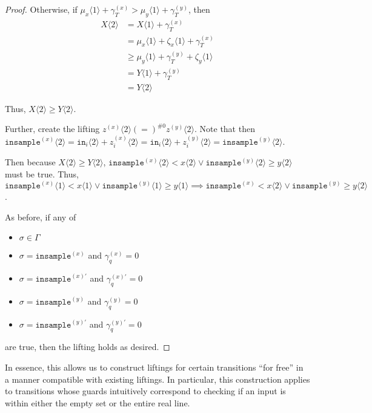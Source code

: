 \documentclass[12pt]{article}
\newcommand{\brangle}[1]{\langle #1 \rangle}
\theoremstyle{definition}
\begin{document}
\begin{proof}
    Otherwise, if $\mu_x\brangle{1}+\gamma_T^{(x)}> \mu_y\brangle{1}+\gamma_T^{(y)}$, then \begin{align*}
        X\brangle{2} &= X\brangle{1} + \gamma_T^{(x)}\\
        &=\mu_x\brangle{1} + \zeta_x\brangle{1} + \gamma_T^{(x)}\\
        &\geq \mu_y\brangle{1} +\gamma_T^{(y)}+\zeta_y\brangle{1}\\
        &=Y\brangle{1} + \gamma_T^{(y)}\\
        &= Y\brangle{2}
    \end{align*}

    Thus, $X\brangle{2}\geq Y\brangle{2}$.

    Further, create the lifting $z^{(x)}\brangle{2}(=)^{\#0}z^{(y)}\brangle{2}$. Note that then $\texttt{insample}^{(x)}\brangle{2}=\texttt{in}_i\brangle{2} + z_i^{(x)}\brangle{2} =\texttt{in}_i\brangle{2} + z_i^{(y)}\brangle{2}=\texttt{insample}^{(y)}\brangle{2}$.

    Then because $X\brangle{2} \geq Y\brangle{2}$, $\texttt{insample}^{(x)}\brangle{2}<x\brangle{2}\lor \texttt{insample}^{(y)}\brangle{2}\geq y\brangle{2}$ must be true. Thus, $\texttt{insample}^{(x)}\brangle{1}<x\brangle{1}\lor\texttt{insample}^{(y)}\brangle{1}\geq y\brangle{1}\implies \texttt{insample}^{(x)}<x\brangle{2}\lor\texttt{insample}^{(y)}\geq y\brangle{2}$.

    As before, if any of \begin{itemize}
        \item $\sigma \in \Gamma$
        \item $\sigma = \texttt{insample}^{(x)}$ and $\gamma_q^{(x)}=0$ 
        \item $\sigma = \texttt{insample}^{(x)\prime}$ and $\gamma_q^{(x)\prime}=0$ 
        \item $\sigma = \texttt{insample}^{(y)}$ and $\gamma_q^{(y)}=0$
        \item $\sigma = \texttt{insample}^{(y)\prime}$ and $\gamma_q^{(y)\prime}=0$
    \end{itemize}
    are true, then the lifting holds as desired. 

\end{proof}

In essence, this allows us to construct liftings for certain transitions ``for free'' in a manner compatible with existing liftings. In particular, this construction applies to transitions whose guards intuitively correspond to checking if an input is within either the empty set or the entire real line. 
\end{document}
